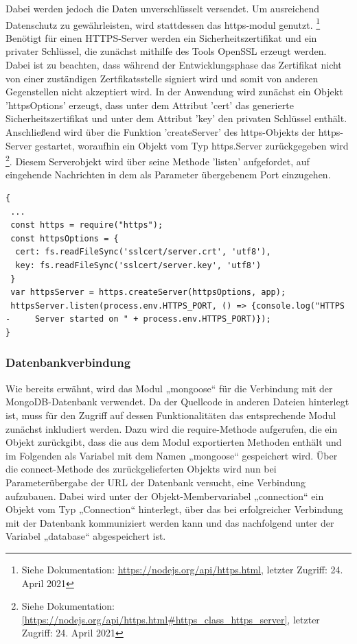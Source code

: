\noindent
Dabei werden jedoch die Daten unverschlüsselt versendet. Um ausreichend Datenschutz zu gewährleisten, wird stattdessen das https-modul genutzt. \footnote{Siehe Dokumentation: \url{https://nodejs.org/api/https.html}, letzter Zugriff: 24. April 2021}
\newline
Benötigt für einen HTTPS-Server werden ein Sicherheitszertifikat und ein privater Schlüssel, die zunächst mithilfe des Tools OpenSSL erzeugt werden.  
Dabei ist zu beachten, dass während der Entwicklungsphase das Zertifikat nicht von einer zuständigen Zertfikatsstelle signiert wird und somit von anderen Gegenstellen nicht akzeptiert wird.
\newline
In der Anwendung wird zunächst ein Objekt 'httpsOptions' erzeugt, dass unter dem Attribut 'cert' das generierte Sicherheitszertifikat und unter dem Attribut 'key' den privaten Schlüssel enthält. Anschließend wird über die Funktion 'createServer' des https-Objekts der https-Server gestartet, woraufhin ein Objekt vom Typ https.Server zurückgegeben wird \footnote{Siehe Dokumentation:  \url{[https://nodejs.org/api/https.html\#https_class_https_server]}, letzter Zugriff: 24. April 2021}. 
Diesem Serverobjekt wird über seine Methode 'listen' aufgefordet, auf eingehende Nachrichten in dem als Parameter übergebenem Port einzugehen.\\

\begin{lstlisting}[caption=Gesicherte Verbindung, label=lst:nodejs_safeconnection]
{
 ...
 const https = require("https");
 const httpsOptions = {
  cert: fs.readFileSync('sslcert/server.crt', 'utf8'),
  key: fs.readFileSync('sslcert/server.key', 'utf8')
 }
 var httpsServer = https.createServer(httpsOptions, app);
 httpsServer.listen(process.env.HTTPS_PORT, () => {console.log("HTTPS - 	Server started on " + process.env.HTTPS_PORT)});
}
\end{lstlisting}


\subsubsection{Datenbankverbindung}
Wie bereits erwähnt, wird das Modul „mongoose“ für die Verbindung mit der MongoDB-Datenbank verwendet. 
Da der Quellcode in anderen Dateien hinterlegt ist, muss für den Zugriff auf dessen Funktionalitäten das entsprechende Modul zunächst inkludiert werden. Dazu wird die require-Methode aufgerufen, die ein Objekt zurückgibt, dass die aus dem Modul exportierten Methoden enthält und im Folgenden als Variabel mit dem Namen „mongoose“ gespeichert wird. 
\newline
Über die connect-Methode des zurückgelieferten Objekts wird nun bei Parameterübergabe der URL der Datenbank versucht, eine Verbindung aufzubauen.  
Dabei wird unter der Objekt-Membervariabel  „connection“ ein Objekt vom Typ „Connection“ hinterlegt, über das bei erfolgreicher Verbindung mit der Datenbank kommuniziert werden kann und das nachfolgend unter der Variabel „database“ abgespeichert ist.\\

